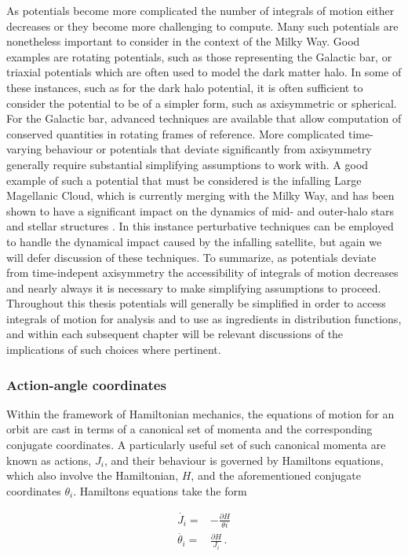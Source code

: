 As potentials become more complicated the number of integrals of motion either decreases or they become more challenging to compute. Many such potentials are nonetheless important to consider in the context of the Milky Way. Good examples are rotating potentials, such as those representing the Galactic bar, or triaxial potentials which are often used to model the dark matter halo. In some of these instances, such as for the dark halo potential, it is often sufficient to consider the potential to be of a simpler form, such as axisymmetric or spherical. For the Galactic bar, advanced techniques are available that allow computation of conserved quantities in rotating frames of reference. More complicated time-varying behaviour or potentials that deviate significantly from axisymmetry generally require substantial simplifying assumptions to work with. A good example of such a potential that must be considered is the infalling Large Magellanic Cloud, which is currently merging with the Milky Way, and has been shown to have a significant impact on the dynamics of mid- and outer-halo stars and stellar structures \parencite[e.g.][]{erkal19}. In this instance perturbative techniques can be employed to handle the dynamical impact caused by the infalling satellite, but again we will defer discussion of these techniques. To summarize, as potentials deviate from time-indepent axisymmetry the accessibility of integrals of motion decreases and nearly always it is necessary to make simplifying assumptions to proceed. Throughout this thesis potentials will generally be simplified in order to access integrals of motion for analysis and to use as ingredients in distribution functions, and within each subsequent chapter will be relevant discussions of the implications of such choices where pertinent.

\subsubsection{Action-angle coordinates}

Within the framework of Hamiltonian mechanics, the equations of motion for an orbit are cast in terms of a canonical set of momenta and the corresponding conjugate coordinates. A particularly useful set of such canonical momenta are known as actions, $J_{i}$, and their behaviour is governed by Hamiltons equations, which also involve the Hamiltonian, $H$, and the aforementioned conjugate coordinates $\theta_{i}$. Hamiltons equations take the form

\begin{equation}
    \label{ch1:eq:hamiltons-equations}
\begin{split}
    \dot{J_{i}}= & -\frac{\partial H}{\theta{i}} \\
    \dot{\theta_{i}} = & \frac{\partial H}{J_{i}}\,.
\end{split}
\end{equation}

